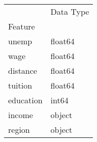 \begin{tabu}{ll}
\toprule
 & Data Type \\
Feature &  \\
\midrule
unemp & float64 \\
wage & float64 \\
distance & float64 \\
tuition & float64 \\
education & int64 \\
income & object \\
region & object \\
\bottomrule
\end{tabu}